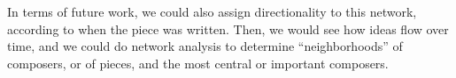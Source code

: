 \documentclass{article}
\begin{document}
In terms of future work, we could also assign directionality to this network, according to when the piece was written. Then, we would see how ideas flow over time, and we could do network analysis to determine ``neighborhoods'' of composers, or of pieces, and the most central or important composers.



\nocite{*}
{}

\end{document}
